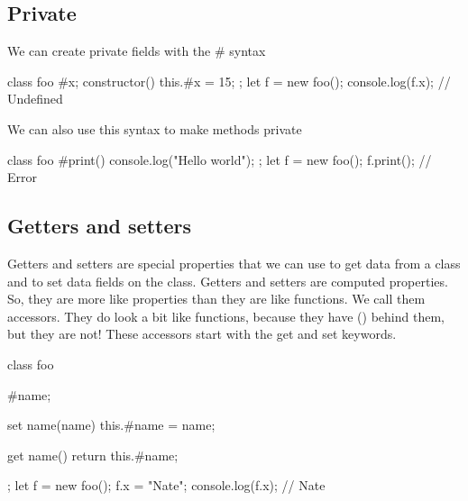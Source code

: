 \documentclass{report}
\begin{document}
    \bigbreak \noindent 
    \subsection{Private}
    \bigbreak \noindent 
    We can create private fields with the \# syntax
    \bigbreak \noindent 
    \begin{jscode}
        class foo {
            #x;
            constructor() {
                this.#x = 15;
            }
        };
        let f = new foo();
        console.log(f.x); // Undefined
    \end{jscode}
    \bigbreak \noindent 
    We can also use this syntax to make methods private
    \bigbreak \noindent 
    \begin{jscode}
        class foo {
            #print() {
                console.log("Hello world");
            }
        };
        let f = new foo();
        f.print(); // Error
    \end{jscode}

    \bigbreak \noindent 
    \subsection{Getters and setters}
    \bigbreak \noindent 
    Getters and setters are special properties that we can use to get data from a class and
    to set data fields on the class. Getters and setters are computed properties. So, they
    are more like properties than they are like functions. We call them accessors. They do
    look a bit like functions, because they have () behind them, but they are not! These accessors start with the get and set keywords.
    \bigbreak \noindent 
    \begin{jscode}
        class foo {
            #name;

            set name(name) {
                this.#name = name;
            }

            get name() {
                return this.#name;
            }
        };
        let f = new foo();
        f.x = "Nate";
        console.log(f.x); // Nate
    \end{jscode}

    \bigbreak \noindent 
\end{document}

